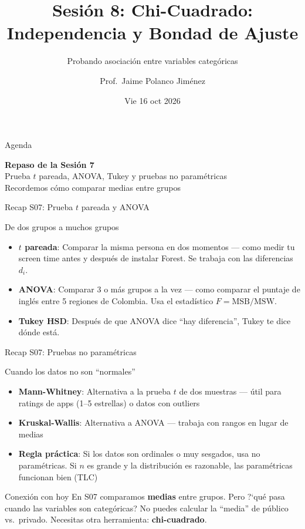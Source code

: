 \documentclass[aspectratio=169, 11pt]{beamer}
\title{Sesión 8: Chi-Cuadrado: Independencia y Bondad de Ajuste}
\subtitle{Probando asociación entre variables categóricas}
\author{Prof.\ Jaime Polanco Jim\'enez}
\date{Vie 16 oct 2026}
\begin{document}
\begin{frame}
\titlepage
\end{frame}

\begin{frame}{Agenda}
\tableofcontents
\end{frame}

\begin{frame}{}
\vfill
\centering
{\Large\textbf{Repaso de la Sesi\'on 7}}\\[1em]
{\normalsize Prueba $t$ pareada, ANOVA, Tukey y pruebas no param\'etricas}\\[0.5em]
{\small Recordemos c\'omo comparar medias entre grupos}
\vfill
\end{frame}

\begin{frame}{Recap S07: Prueba $t$ pareada y ANOVA}
\small
\begin{exampleblock}{De dos grupos a muchos grupos}
\begin{itemize}\setlength{\itemsep}{2pt}
  \item \textbf{$t$ pareada}: Comparar la \alert{misma} persona en dos momentos --- como medir tu screen time antes y despu\'es de instalar Forest. Se trabaja con las diferencias $d_i$.
  \item \textbf{ANOVA}: Comparar \alert{3 o m\'as} grupos a la vez --- como comparar el puntaje de ingl\'es entre 5 regiones de Colombia. Usa el estad\'istico $F = \text{MSB}/\text{MSW}$.
  \item \textbf{Tukey HSD}: Despu\'es de que ANOVA dice ``hay diferencia'', Tukey te dice \alert{d\'onde} est\'a.
\end{itemize}
\end{exampleblock}
\end{frame}

\begin{frame}{Recap S07: Pruebas no param\'etricas}
\small
\begin{exampleblock}{Cuando los datos no son ``normales''}
\begin{itemize}\setlength{\itemsep}{2pt}
  \item \textbf{Mann-Whitney}: Alternativa a la prueba $t$ de dos muestras --- \'util para ratings de apps (1--5 estrellas) o datos con outliers
  \item \textbf{Kruskal-Wallis}: Alternativa a ANOVA --- trabaja con rangos en lugar de medias
  \item \textbf{Regla pr\'actica}: Si los datos son ordinales o muy sesgados, usa no param\'etricas. Si $n$ es grande y la distribuci\'on es razonable, las param\'etricas funcionan bien (TLC)
\end{itemize}
\end{exampleblock}

\vspace{0.2cm}
\begin{block}{Conexi\'on con hoy}
En S07 comparamos \textbf{medias} entre grupos. Pero ?`qu\'e pasa cuando las variables son \alert{categ\'oricas}? No puedes calcular la ``media'' de p\'ublico vs.\ privado. Necesitas otra herramienta: \textbf{chi-cuadrado}.
\end{block}
\end{frame}
\end{document}
